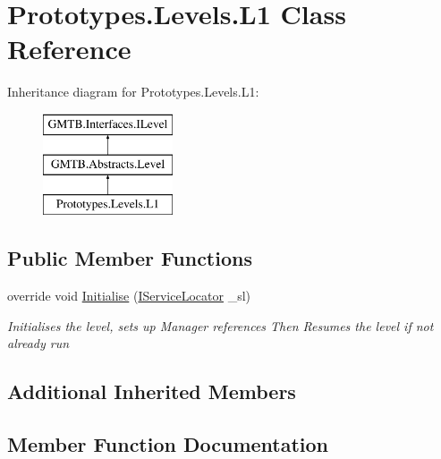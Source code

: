 \hypertarget{class_prototypes_1_1_levels_1_1_l1}{}\section{Prototypes.\+Levels.\+L1 Class Reference}
\label{class_prototypes_1_1_levels_1_1_l1}
Inheritance diagram for Prototypes.\+Levels.\+L1\+:\begin{figure}[H]
\begin{center}
\leavevmode
\includegraphics[height=3.000000cm]{class_prototypes_1_1_levels_1_1_l1}
\end{center}
\end{figure}
\subsection*{Public Member Functions}
\begin{DoxyCompactItemize}
\item 
override void \mbox{\hyperlink{class_prototypes_1_1_levels_1_1_l1_acdc4fddb5e25296cce22e0c275b32de7}{Initialise}} (\mbox{\hyperlink{interface_g_m_t_b_1_1_interfaces_1_1_i_service_locator}{I\+Service\+Locator}} \+\_\+sl)
\begin{DoxyCompactList}\small\item\em Initialises the level, sets up Manager references Then Resumes the level if not already run \end{DoxyCompactList}\end{DoxyCompactItemize}
\subsection*{Additional Inherited Members}


\subsection{Member Function Documentation}
\mbox{\label{class_prototypes_1_1_levels_1_1_l1_acdc4fddb5e25296cce22e0c275b32de7}} 
